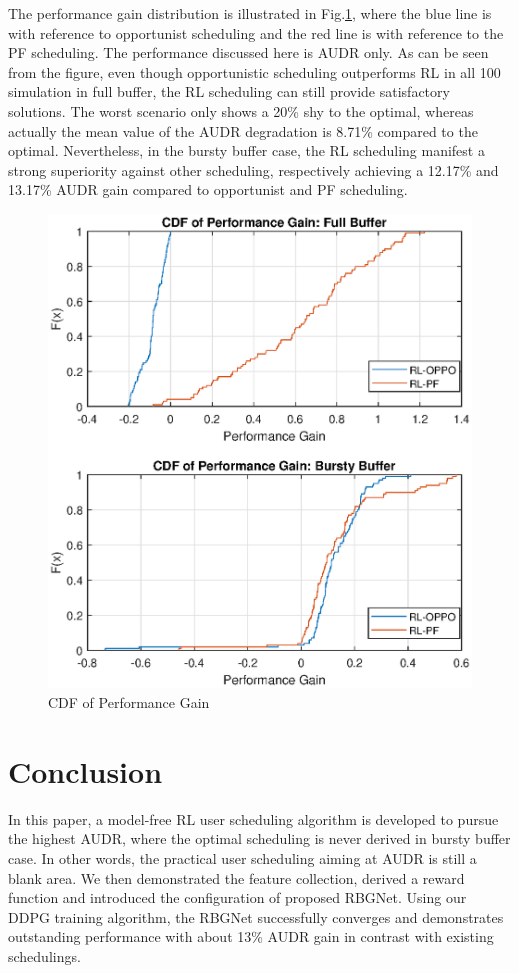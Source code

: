 \documentclass[conference,compsocconf]{IEEEtran}
\begin{document}
The performance gain distribution is illustrated in Fig.\ref{fig:3}, where the blue line is with reference to opportunist scheduling and the red line is with reference to the PF scheduling. The performance discussed here is AUDR only. As can be seen from the figure, even though opportunistic scheduling outperforms RL in all 100 simulation in full buffer, the RL scheduling can still provide satisfactory solutions. The worst scenario only shows a 20\% shy to the optimal, whereas actually the mean value of the AUDR degradation is 8.71\% compared to the optimal. Nevertheless, in the bursty buffer case, the RL scheduling manifest a strong superiority against other scheduling, respectively achieving a 12.17\% and 13.17\% AUDR gain compared to opportunist and PF scheduling.
\begin{figure}
	\centering
	\includegraphics[width=\linewidth]{Figs/cdf.eps}
	\caption{CDF of Performance Gain}
	\label{fig:3}
\end{figure}
\section{Conclusion}

In this paper, a model-free RL user scheduling algorithm is developed to pursue the highest AUDR, where the optimal scheduling is never derived in bursty buffer case. In other words, the practical user scheduling aiming at AUDR is still a blank area. We then demonstrated the feature collection, derived a reward function and introduced the configuration of proposed RBGNet. Using our DDPG training algorithm, the RBGNet successfully converges and demonstrates outstanding performance with about 13\%  AUDR gain in contrast with existing schedulings.




\end{document}

